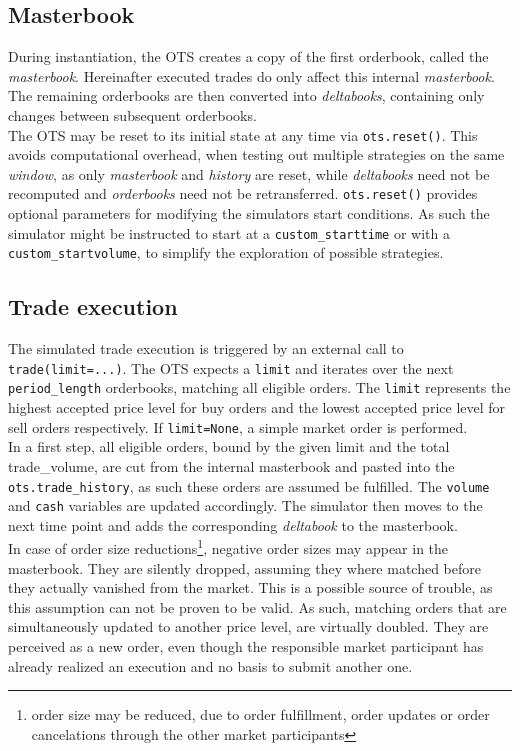 \subsection{Masterbook}
During instantiation, the \ac{OTS} creates a copy of the first orderbook, called the \emph{masterbook}. Hereinafter executed trades do only affect this internal \emph{masterbook}. The remaining orderbooks are then converted into \emph{deltabooks}, containing only changes between subsequent orderbooks.\\

The \ac{OTS} may be reset to its initial state at any time via \lstinline!ots.reset()!. This avoids computational overhead, when testing out multiple strategies on the same \emph{window}, as only \emph{masterbook} and \emph{history} are reset, while \emph{deltabooks} need not be recomputed and \emph{orderbooks} need not be retransferred. \lstinline!ots.reset()! provides optional parameters for modifying the simulators start conditions. As such the simulator might be instructed to start at a \lstinline!custom_starttime! or with a \lstinline!custom_startvolume!, to simplify the exploration of possible strategies.

\subsection{Trade execution}
\label{chap:tradeexecution}
The simulated trade execution is triggered by an external call to \lstinline!trade(limit=...)!. The \ac{OTS} expects a \lstinline!limit! and iterates over the next \lstinline!period_length! orderbooks, matching all eligible orders. The \lstinline!limit! represents the highest accepted price level for buy orders and the lowest accepted price level for sell orders respectively. If \lstinline!limit=None!, a simple market order is performed.\\

In a first step, all eligible orders, bound by the given limit and the total trade\_volume, are cut from the internal masterbook and pasted into the \lstinline!ots.trade_history!, as such these orders are assumed be fulfilled. The \lstinline!volume! and \lstinline!cash! variables are updated accordingly.
The simulator then moves to the next time point and adds the corresponding \emph{deltabook} to the masterbook.\\

In case of order size reductions\footnote{order size may be reduced, due to order fulfillment, order updates or order cancelations through the other market participants}, negative order sizes may appear in the masterbook. They are silently dropped, assuming they where matched before they actually vanished from the market. This is a possible source of trouble, as this assumption can not be proven to be valid. As such, matching orders that are simultaneously updated to another price level, are virtually doubled. They are perceived as a new order, even though the responsible market participant has already realized an execution and no basis to submit another one.\\

